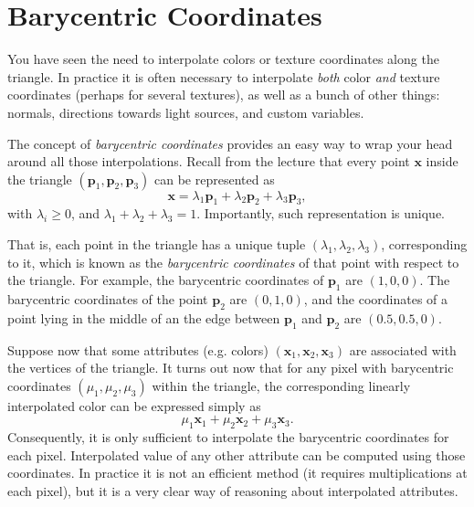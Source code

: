 \documentclass{article}
\newcommand{\bx}{\mathbf{x}}
\newcommand{\bp}{\mathbf{p}}
\begin{document}
\section{Barycentric Coordinates}
You have seen the need to interpolate colors or texture coordinates along the triangle. In practice it is often necessary to interpolate \emph{both} color \emph{and} texture coordinates (perhaps for several textures), as well as a bunch of other things: normals, directions towards light sources, and custom variables.

The concept of \emph{barycentric coordinates} provides an easy way to wrap your head around all those interpolations. Recall from the lecture that every point $\bx$ inside the triangle $(\bp_1, \bp_2, \bp_3)$ can be represented as
$$
\bx = \lambda_1 \bp_1 + \lambda_2 \bp_2 + \lambda_3 \bp_3,
$$
with $\lambda_i \geq 0$, and $\lambda_1 + \lambda_2 + \lambda_3 = 1$. Importantly, such representation is unique.

That is, each point in the triangle has a unique tuple $(\lambda_1, \lambda_2, \lambda_3)$, corresponding to it, which is known as the \emph{barycentric coordinates} of that point with respect to the triangle. For example, the barycentric coordinates of $\bp_1$ are $(1, 0, 0)$. The barycentric coordinates of the point $\bp_2$ are $(0, 1, 0)$, and the coordinates of a point lying in the middle of an the edge between $\bp_1$ and $\bp_2$ are $(0.5, 0.5, 0)$.

Suppose now that some attributes (e.g. colors) $(\bx_1, \bx_2, \bx_3)$ are associated with the vertices of the triangle. It turns out now that for any pixel with barycentric coordinates $(\mu_1, \mu_2, \mu_3)$ within the triangle, the corresponding linearly interpolated color can be expressed simply as
$$
\mu_1 \bx_1 + \mu_2 \bx_2 + \mu_3 \bx_3.
$$
Consequently, it is only sufficient to interpolate the barycentric coordinates for each pixel. Interpolated value of any other attribute can be computed using those coordinates. In practice it is not an efficient method (it requires multiplications at each pixel), but it is a very clear way of reasoning about interpolated attributes.
\end{document}
